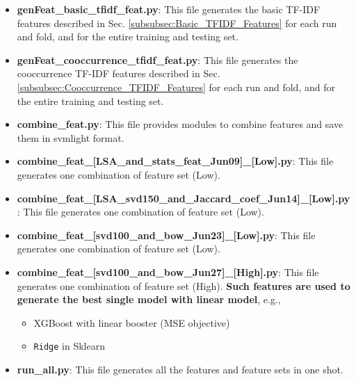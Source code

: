 \documentclass[12pt]{article}
\begin{document}
\begin{itemize}
\item \textbf{genFeat\_basic\_tfidf\_feat.py}: This file generates the basic TF-IDF features described in Sec. \ref{subsubsec:Basic_TFIDF_Features} for each run and fold, and for the entire training and testing set.
\item \textbf{genFeat\_cooccurrence\_tfidf\_feat.py}: This file generates the cooccurrence TF-IDF features described in Sec. \ref{subsubsec:Cooccurrence_TFIDF_Features} for each run and fold, and for the entire training and testing set.
\item \textbf{combine\_feat.py}: This file provides modules to combine features and save them in svmlight format.
\item \textbf{combine\_feat\_[LSA\_and\_stats\_feat\_Jun09]\_[Low].py}: This file generates one combination of feature set (Low).
\item \textbf{combine\_feat\_[LSA\_svd150\_and\_Jaccard\_coef\_Jun14]\_[Low].py}: This file generates one combination of feature set (Low).
\item \textbf{combine\_feat\_[svd100\_and\_bow\_Jun23]\_[Low].py}: This file generates one combination of feature set (Low).
\item \textbf{combine\_feat\_[svd100\_and\_bow\_Jun27]\_[High].py}: This file generates one combination of feature set (High).
    \textbf{Such features are used to generate the best single model with linear model}, e.g.,
    \begin{itemize}
        \item XGBoost with linear booster (MSE objective)
        \item \texttt{Ridge} in Sklearn
    \end{itemize}
\item \textbf{run\_all.py}: This file generates all the features and feature sets in one shot.
\end{itemize}
\end{document}
